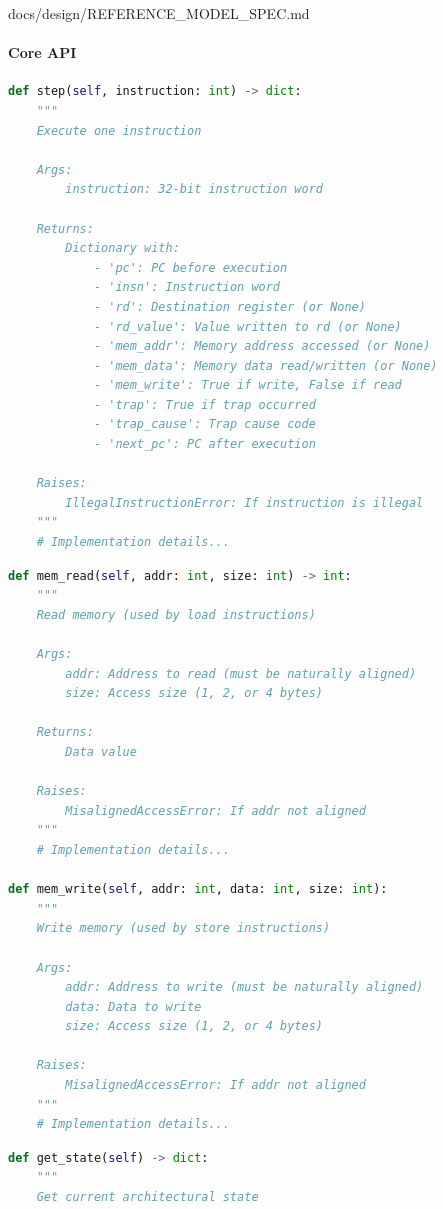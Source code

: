 \begin{relocated}{docs/design/REFERENCE_MODEL_SPEC.md}
\paragraph{Core API}\label{ds:ch:reference-model:core-api}

\begin{lstlisting}[language=Python]
def step(self, instruction: int) -> dict:
    """
    Execute one instruction

    Args:
        instruction: 32-bit instruction word

    Returns:
        Dictionary with:
            - 'pc': PC before execution
            - 'insn': Instruction word
            - 'rd': Destination register (or None)
            - 'rd_value': Value written to rd (or None)
            - 'mem_addr': Memory address accessed (or None)
            - 'mem_data': Memory data read/written (or None)
            - 'mem_write': True if write, False if read
            - 'trap': True if trap occurred
            - 'trap_cause': Trap cause code
            - 'next_pc': PC after execution

    Raises:
        IllegalInstructionError: If instruction is illegal
    """
    # Implementation details...
\end{lstlisting}

\begin{lstlisting}[language=Python]
def mem_read(self, addr: int, size: int) -> int:
    """
    Read memory (used by load instructions)

    Args:
        addr: Address to read (must be naturally aligned)
        size: Access size (1, 2, or 4 bytes)

    Returns:
        Data value

    Raises:
        MisalignedAccessError: If addr not aligned
    """
    # Implementation details...

def mem_write(self, addr: int, data: int, size: int):
    """
    Write memory (used by store instructions)

    Args:
        addr: Address to write (must be naturally aligned)
        data: Data to write
        size: Access size (1, 2, or 4 bytes)

    Raises:
        MisalignedAccessError: If addr not aligned
    """
    # Implementation details...
\end{lstlisting}

\begin{lstlisting}[language=Python]
def get_state(self) -> dict:
    """
    Get current architectural state


\end{lstlisting}
\end{relocated}
